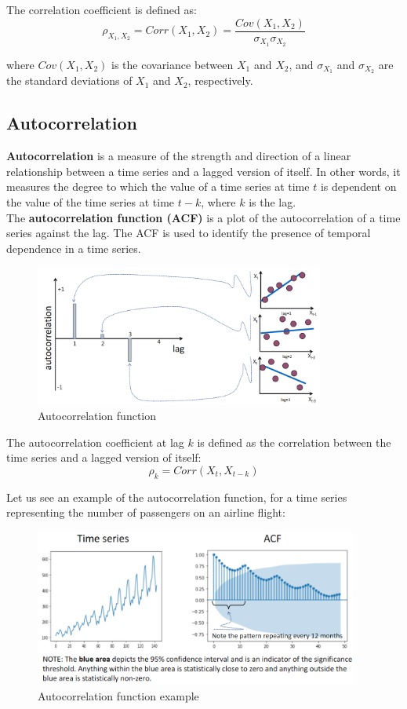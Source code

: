 The correlation coefficient is defined as:
$$\rho_{X_1, X_2} = Corr(X_1, X_2) = \frac{Cov(X_1, X_2)}{\sigma_{X_1} \sigma_{X_2}}$$

where $Cov(X_1, X_2)$ is the covariance between $X_1$ and $X_2$, and $\sigma_{X_1}$
and $\sigma_{X_2}$ are the standard deviations of $X_1$ and $X_2$, respectively.

\subsection{Autocorrelation}

\textbf{Autocorrelation} is a measure of the strength and direction of a linear relationship
between a time series and a lagged version of itself. In other words, it measures the
degree to which the value of a time series at time $t$ is dependent on the value of the
time series at time $t - k$, where $k$ is the lag.\\

The \textbf{autocorrelation function (ACF)} is a plot of the autocorrelation of a time series
against the lag. The ACF is used to identify the presence of temporal dependence in
a time series.

\begin{figure}[H]
    \centering
    \includegraphics[width=0.85\textwidth]{figures/acf.png}
    \caption{Autocorrelation function}
    \label{fig:acf}
\end{figure}

The autocorrelation coefficient at lag $k$ is defined as the correlation between the
time series and a lagged version of itself:
$$\rho_k = Corr(X_t, X_{t-k})$$

Let us see an example of the autocorrelation function, for a time series representing
the number of passengers on an airline flight:

\begin{figure}[H]
    \centering
    \includegraphics[width=0.95\textwidth]{figures/acf_example.png}
    \caption{Autocorrelation function example}
    \label{fig:acf_example}
\end{figure}


